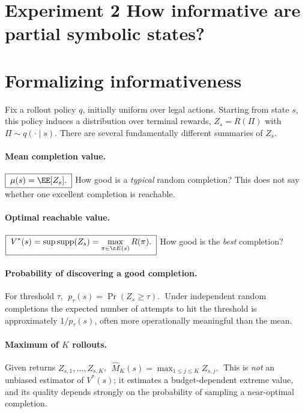 
\section*{Experiment 2 \quad How informative are partial symbolic states?}

\section{Formalizing informativeness}

Fix a rollout policy $q$, initially uniform over legal actions. Starting from
state $s$, this policy induces a distribution over terminal rewards,
$Z_s=R(\Pi)$ with $\Pi\sim q(\cdot\mid s)$. There are several fundamentally
different summaries of $Z_s$.

\paragraph{Mean completion value.} $\boxed{\;\mu(s)=\EE[Z_s].\;}$ How good is a
\emph{typical} random completion? This does not say whether one excellent
completion is reachable.

\paragraph{Optimal reachable value.}
$\boxed{\;V^*(s)=\sup\operatorname{supp}(Z_s)=\max_{\pi\in\c E(s)}R(\pi).\;}$
How good is the \emph{best} completion?

\paragraph{Probability of discovering a good completion.} For threshold $\tau$,
$\boxed{\;p_\tau(s)=\Pr(Z_s\ge\tau).\;}$ Under independent random completions the
expected number of attempts to hit the threshold is approximately $1/p_\tau(s)$,
often more operationally meaningful than the mean.

\paragraph{Maximum of $K$ rollouts.} Given returns $Z_{s,1},\ldots,Z_{s,K}$,
$\boxed{\;\widehat M_K(s)=\max_{1\le j\le K}Z_{s,j}.\;}$ This is \emph{not} an
unbiased estimator of $V^*(s)$; it estimates a budget-dependent extreme value,
and its quality depends strongly on the probability of sampling a near-optimal
completion.

